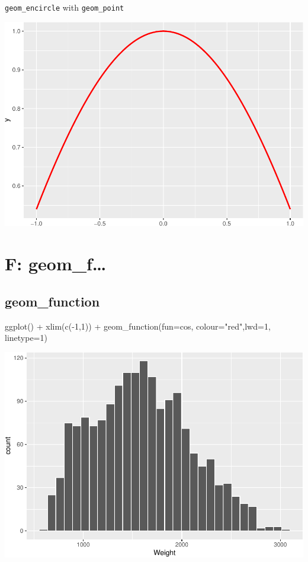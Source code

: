 \documentclass[
]{book}
\newenvironment{Shaded}{\begin{snugshade}}{\end{snugshade}}
\newcommand{\AttributeTok}[1]{\textcolor[rgb]{0.77,0.63,0.00}{#1}}
\newcommand{\DecValTok}[1]{\textcolor[rgb]{0.00,0.00,0.81}{#1}}
\newcommand{\FunctionTok}[1]{\textcolor[rgb]{0.00,0.00,0.00}{#1}}
\newcommand{\NormalTok}[1]{#1}
\newcommand{\SpecialCharTok}[1]{\textcolor[rgb]{0.00,0.00,0.00}{#1}}
\newcommand{\StringTok}[1]{\textcolor[rgb]{0.31,0.60,0.02}{#1}}
\begin{document}
\texttt{geom\_encircle} with \texttt{geom\_point}

\includegraphics{Data-Visualisation-geom-Encyclopedia_files/figure-latex/unnamed-chunk-38-1.pdf}

\hypertarget{f-geom_f}{%
\chapter{F: geom\_f\ldots{}}\label{f-geom_f}}

\hypertarget{geom_function}{%
\section{geom\_function}\label{geom_function}}

\begin{Shaded}
\begin{Highlighting}[]
\FunctionTok{ggplot}\NormalTok{() }\SpecialCharTok{+} \FunctionTok{xlim}\NormalTok{(}\FunctionTok{c}\NormalTok{(}\SpecialCharTok{{-}}\DecValTok{1}\NormalTok{,}\DecValTok{1}\NormalTok{)) }\SpecialCharTok{+} \FunctionTok{geom\_function}\NormalTok{(}\AttributeTok{fun=}\NormalTok{cos, }\AttributeTok{colour=}\StringTok{"red"}\NormalTok{,}\AttributeTok{lwd=}\DecValTok{1}\NormalTok{, }\AttributeTok{linetype=}\DecValTok{1}\NormalTok{)}
\end{Highlighting}
\end{Shaded}

\includegraphics{Data-Visualisation-geom-Encyclopedia_files/figure-latex/unnamed-chunk-39-1.pdf}
\end{document}
